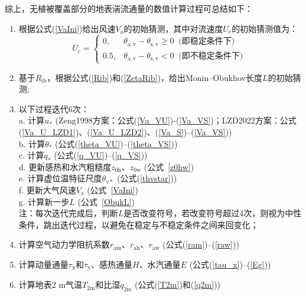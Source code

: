 综上，无植被覆盖部分的地表湍流通量的数值计算过程可总结如下：
\begin{enumerate}
  \item 根据公式(\ref{VaIni})给出风速$V_{\mathrm{a}}$的初始猜测，其中对流速度$U_{\mathrm {c}}$的初始猜测值为：
    \begin{equation}
      U_{\mathrm{c}}= \begin{cases}
        0, & \theta_{\mathrm{a,v}}-\theta_{\mathrm{s,v}} \geqslant 0\ \text { (即稳定条件下) } \\
        0.5, & \theta_{\mathrm{a,v}}-\theta_{\mathrm{s,v}}<0\ \text { (即不稳定条件下) }
      \end{cases}
    \end{equation}
  \item 基于$R_{\mathrm{ib}}$，根据公式(\ref{Rib})和(\ref{ZetaRib})，给出Monin--Obukhov长度$L$的初始猜测;
  \item 以下过程迭代6次：\\
    a. 计算$u_\ast$ (Zeng1998方案：公式(\ref{Va_VU})-(\ref{Va_VS})；LZD2022方案：公式(\ref{Va_U_LZD1})、(\ref{Va_U_LZD2})、(\ref{Va_S})--(\ref{Va_VS})) \\
    b. 计算$\theta_\ast$ (公式(\ref{theta_VU})--(\ref{theta_VS})) \\
    c. 计算$q_\ast$ (公式(\ref{q_VU})--(\ref{q_VS})) \\
    d. 更新感热和水汽粗糙度$z_{\mathrm{0h}}$、$z_{\mathrm{0w}}$ (公式~\eqref{z0hw}) \\
    e. 计算虚位温特征尺度$\theta_{\mathrm{v\ast}}$ (公式(\ref{thvstar})) \\
    f. 更新大气风速$V_{\mathrm {a}}$ (公式~\eqref{VaIni}) \\
    g. 计算新一步$L$ (公式~\eqref{ObukL}) \\
    注：每次迭代完成后，判断$L$是否改变符号，若改变符号超过4次，则视为中性条件，跳出迭代过程，以避免在稳定与不稳定条件之间来回变化；
  \item 计算空气动力学阻抗系数$r_{\mathrm{am}}$、$r_{\mathrm{ah}}$、$r_{\mathrm{aw}}$ (公式(\ref{ram})--(\ref{raw}))
  \item 计算动量通量$\tau_{\mathrm{x}}$和$\tau_{\mathrm{y}}$、感热通量$H$、水汽通量$E$ (公式(\ref{tau_x})--(\ref{Eg}))
  \item 计算地表2 m气温$T_{\mathrm{2m}}$和比湿$q_{\mathrm{2m}}$ (公式(\ref{T2m})和(\ref{q2m}))
\end{enumerate}

